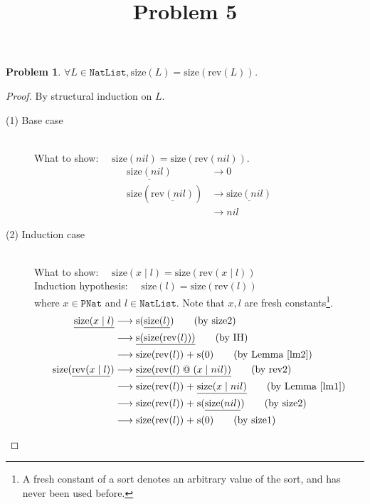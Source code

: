 \documentclass[12pt, a4paper]{article}
\title{Problem 5}
\date{\vspace{-5ex}}
\newtheorem{problem}{Problem}
\newcommand{\rel}[1]{\mathrel{#1}}
\newcommand{\rmx}[1]{\mathrm{#1}}
\newcommand{\larrow}{\longrightarrow}
\newcommand{\under}{\underline}
\begin{document}
\maketitle

\begin{problem}
$\forall L \in \mathtt{NatList}, \rmx{size}(L) = \rmx{size}(\rmx{rev}(L))$.
\end{problem}
\begin{proof}
By structural induction on $L$.

\begin{description}
\item[(1) Base case]~\\
\noindent
What to show: $\quad \rmx{size}(nil) = \rmx{size}(\rmx{rev}(nil))$.
\begin{align*}
\under{\rmx{size}(nil)}
	&\larrow 0 \tag{by size1} \\
\rmx{size}(\under{\rmx{rev}(nil)})
	&\larrow \under{\rmx{size}(nil)} \tag{by rev1} \\
	&\larrow nil \tag{by size1}
\end{align*}

\item[(2) Induction case]~\\
What to show: $\quad \rmx{size}(x \rel{|} l) = \rmx{size}(\rmx{rev}(x \rel{|} l))$ \\
Induction hypothesis: $\quad \rmx{size}(l) = \rmx{size}(\rmx{rev}(l))$  \\
where $x \in \mathtt{PNat}$ and $l \in \mathtt{NatList}$. Note that $x, l$ are fresh constants\footnote{A fresh constant of a sort denotes an arbitrary value of the sort, and has never been used before.}.
\begin{align*}
\under{\rmx{size}(x \rel{|} l)}
	&\larrow \rmx{s}(\under{\rmx{size}(l)}) \tag{by size2} \\
	&\larrow \under{\rmx{s}(\rmx{size}(\rmx{rev}(l)))} \tag{by IH} \\
	&\larrow \rmx{size}(\rmx{rev}(l)) \rel{+} \rmx{s}(0) \tag{by Lemma~\ref{lm2}} \\
\rmx{size}(\under{\rmx{rev}(x \rel{|} l)})
	&\larrow \under{\rmx{size}(\rmx{rev}(l) \rel{@} (x \rel{|} nil))} \tag{by rev2} \\
	&\larrow \rmx{size}(\rmx{rev}(l)) \rel{+} \under{\rmx{size}(x \rel{|} nil)} \tag{by Lemma~\ref{lm1}} \\
	&\larrow \rmx{size}(\rmx{rev}(l)) \rel{+} \rmx{s}(\under{\rmx{size}(nil)}) \tag{by size2} \\
	&\larrow \rmx{size}(\rmx{rev}(l)) \rel{+} \rmx{s}(0) \tag{by size1}
\end{align*}

\end{description}

\end{proof}
\end{document}
